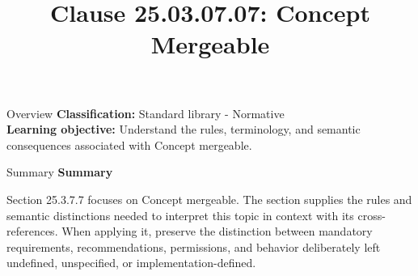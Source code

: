 \documentclass[10pt,letterpaper]{article}
\title{Clause 25.03.07.07: Concept Mergeable}
\author{}
\date{}
\begin{document}
\maketitle
\begin{CornellOverviewBox}{Overview}
\textbf{Classification:} Standard library - Normative\\[2pt]
\textbf{Learning objective:} Understand the rules, terminology, and semantic consequences associated with Concept mergeable.
\end{CornellOverviewBox}\begin{CornellSummaryBox}{Summary}
{\sffamily\bfseries\color{Accent} Summary}\par\vspace{3pt}Section 25.3.7.7 focuses on Concept mergeable. The section supplies the rules and semantic distinctions needed to interpret this topic in context with its cross-references. When applying it, preserve the distinction between mandatory requirements, recommendations, permissions, and behavior deliberately left undefined, unspecified, or implementation-defined.
\end{CornellSummaryBox}
\end{document}
